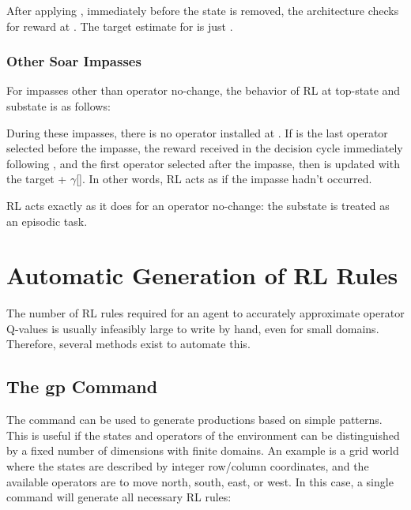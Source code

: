 \begin{list}{S2}
\item After applying , immediately before the state  is removed, the architecture checks for reward  at . The target estimate for  is just .

\end{list}

\subsubsection{Other Soar Impasses}
For impasses other than operator no-change, the behavior of RL at top-state  and substate  is as follows:

\begin{list}{S1}
\item During these impasses, there is no operator installed at .  If  is the last operator selected before the impasse,  the reward received in the decision cycle immediately following , and  the first operator selected after the impasse, then  is updated with the target  + $\gamma$[]. In other words, RL acts as if the impasse hadn't occurred.
\end{list}

\begin{list}{S2}
\item RL acts exactly as it does for an operator no-change: the substate is treated as an episodic task.

\end{list}

\section{Automatic Generation of RL Rules}

The number of RL rules required for an agent to accurately approximate operator Q-values is usually infeasibly large to write by hand, even for small domains.
Therefore, several methods exist to automate this.

\subsection{The gp Command}
The  command can be used to generate productions based on simple patterns.
This is useful if the states and operators of the environment can be distinguished by a fixed number of dimensions with finite domains.
An example is a grid world where the states are described by integer row/column coordinates, and the available operators are to move north, south, east, or west.
In this case, a single  command will generate all necessary RL rules:
	
